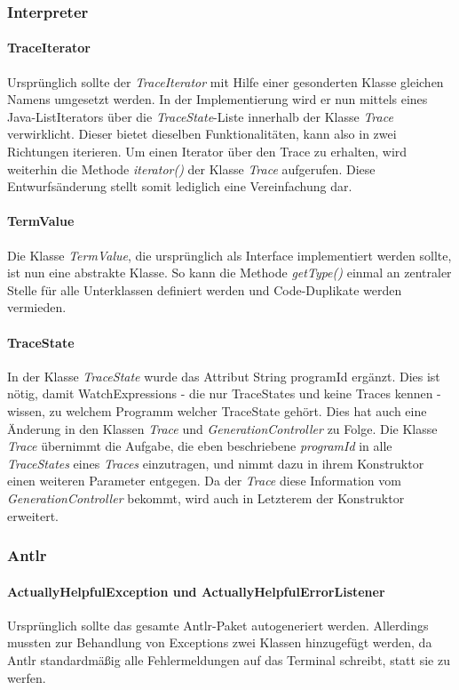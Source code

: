 \documentclass[parskip=full]{scrartcl}
\begin{document}
\subsubsection{Interpreter}
\paragraph{TraceIterator}
Ursprünglich sollte der \textit{TraceIterator} mit Hilfe einer gesonderten Klasse gleichen Namens umgesetzt werden. In der Implementierung wird er nun mittels eines Java-ListIterators über die \textit{TraceState}-Liste innerhalb der Klasse \textit{Trace} verwirklicht. Dieser bietet dieselben Funktionalitäten, kann also in zwei Richtungen iterieren. Um einen Iterator über den Trace zu erhalten, wird weiterhin die Methode \textit{iterator()} der Klasse \textit{Trace} aufgerufen. Diese Entwurfsänderung stellt somit lediglich eine Vereinfachung dar.
\paragraph{TermValue}
Die Klasse \textit{TermValue}, die ursprünglich als Interface implementiert werden sollte, ist nun eine abstrakte Klasse. So kann die Methode \textit{getType()} einmal an zentraler Stelle für alle Unterklassen definiert werden und Code-Duplikate werden vermieden.
\paragraph{TraceState}
In der Klasse \textit{TraceState} wurde das Attribut String programId ergänzt. Dies ist nötig, damit WatchExpressions - die nur TraceStates und keine Traces kennen - wissen, zu welchem Programm welcher TraceState gehört. Dies hat auch eine Änderung in den Klassen \textit{Trace} und \textit{GenerationController} zu Folge. Die Klasse \textit{Trace} übernimmt die Aufgabe, die eben beschriebene \textit{programId} in alle \textit{TraceStates} eines \textit{Traces} einzutragen, und nimmt dazu in ihrem Konstruktor einen weiteren Parameter entgegen. Da der \textit{Trace} diese Information vom  \textit{GenerationController} bekommt, wird auch in Letzterem der Konstruktor erweitert.

\subsubsection{Antlr}
\paragraph{ActuallyHelpfulException und ActuallyHelpfulErrorListener}
Ursprünglich sollte das gesamte Antlr-Paket autogeneriert werden. Allerdings mussten zur Behandlung von Exceptions zwei Klassen hinzugefügt werden, da Antlr standardmäßig alle Fehlermeldungen auf das Terminal schreibt, statt sie zu werfen.

 
\end{document}
